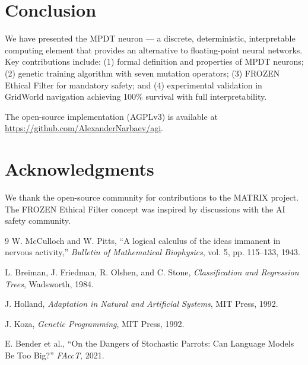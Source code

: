 \documentclass{article}
\begin{document}
\section{Conclusion}

We have presented the MPDT neuron — a discrete, deterministic, interpretable 
computing element that provides an alternative to floating-point neural networks. 
Key contributions include: (1) formal definition and properties of MPDT neurons; 
(2) genetic training algorithm with seven mutation operators; (3) FROZEN Ethical 
Filter for mandatory safety; and (4) experimental validation in GridWorld 
navigation achieving 100\% survival with full interpretability.

The open-source implementation (AGPLv3) is available at 
\url{https://github.com/AlexanderNarbaev/agi}.

\section*{Acknowledgments}

We thank the open-source community for contributions to the MATRIX project. 
The FROZEN Ethical Filter concept was inspired by discussions with the AI 
safety community.

\begin{thebibliography}{9}
W. McCulloch and W. Pitts, ``A logical calculus of the ideas immanent in 
nervous activity,'' \emph{Bulletin of Mathematical Biophysics}, vol. 5, 
pp. 115--133, 1943.

L. Breiman, J. Friedman, R. Olshen, and C. Stone, \emph{Classification and 
Regression Trees}, Wadsworth, 1984.

J. Holland, \emph{Adaptation in Natural and Artificial Systems}, MIT Press, 1992.

J. Koza, \emph{Genetic Programming}, MIT Press, 1992.

E. Bender et al., ``On the Dangers of Stochastic Parrots: Can Language Models 
Be Too Big?'' \emph{FAccT}, 2021.
\end{thebibliography}
\end{document}
